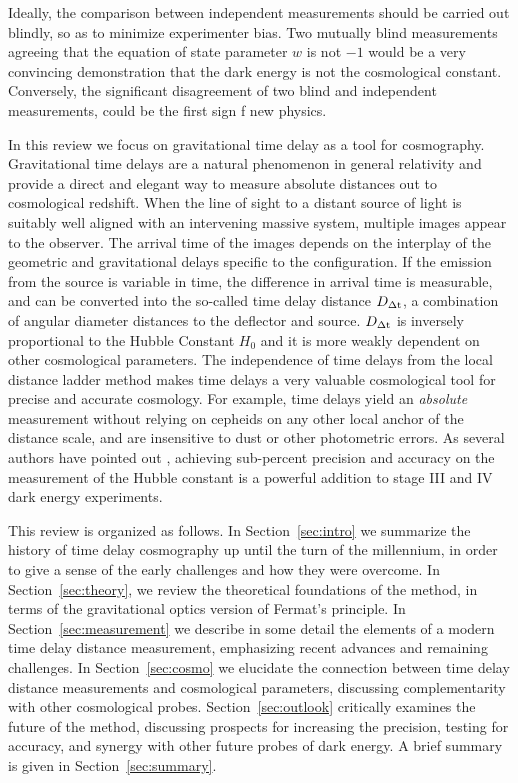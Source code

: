 Ideally, the comparison between independent measurements should be
carried out blindly, so as to minimize experimenter bias. Two mutually
blind measurements agreeing that the equation of state parameter $w$
is not $-1$ would be a very convincing demonstration that the dark
energy is not the cosmological constant. Conversely, the significant
disagreement of two blind and independent measurements, could be the
first sign f new physics.

In this review we focus on gravitational time delay as a tool for
cosmography.  Gravitational time delays are a natural phenomenon in
general relativity and provide a direct and elegant way to measure
absolute distances out to cosmological redshift. When the line of
sight to a distant source of light is suitably well aligned with an
intervening massive system, multiple images appear to the
observer. The arrival time of the images depends on the interplay of
the geometric and gravitational delays specific to the
configuration. If the emission from the source is variable in time,
the difference in arrival time is measurable, and can be converted
into the so-called time delay distance $D_{\Delta{\rm t}}$, a combination of
angular diameter distances to the deflector and source. $D_{\Delta{\rm t}}$ is
inversely proportional to the Hubble Constant $H_0$ and it is more
weakly dependent on other cosmological parameters. The independence of
time delays from the local distance ladder method makes time delays a
very valuable cosmological tool for precise and accurate
cosmology. For example, time delays yield an {\it absolute}
measurement without relying on cepheids on any other local anchor of
the distance scale, and are insensitive to dust or other photometric
errors.  As several authors have pointed out
\citep{Lin11,Suy++12,Wei++13}, achieving sub-percent precision and
accuracy on the measurement of the Hubble constant is a powerful
addition to stage III and IV dark energy experiments.

This review is organized as follows. In Section~\ref{sec:intro} we
summarize the history of time delay cosmography up until the turn of
the millennium, in order to give a sense of the early challenges and
how they were overcome. In Section~\ref{sec:theory}, we review the
theoretical foundations of the method, in terms of the gravitational
optics version of Fermat's principle. In Section~\ref{sec:measurement}
we describe in some detail the elements of a modern time delay
distance measurement, emphasizing recent advances and remaining
challenges. In Section~\ref{sec:cosmo} we elucidate the connection
between time delay distance measurements and cosmological parameters,
discussing complementarity with other cosmological
probes. Section~\ref{sec:outlook} critically examines the future of
the method, discussing prospects for increasing the precision, testing
for accuracy, and synergy with other future probes of dark energy. A
brief summary is given in Section~\ref{sec:summary}.

